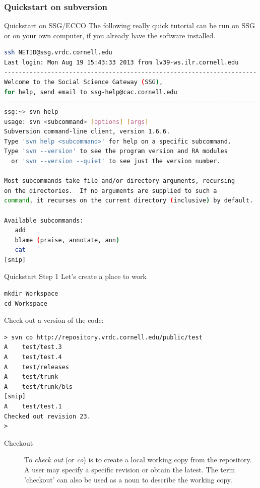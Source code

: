 \documentclass[xcolor=table,compress]{beamer}
\begin{document}
\subsubsection{Quickstart on subversion}
\begin{frame}[fragile]{Quickstart on SSG/ECCO}
The following really quick tutorial can be run on SSG or on your own computer, if you already have the software installed.
\begin{lstlisting}[language=bash,numbers=none]
ssh NETID@ssg.vrdc.cornell.edu
Last login: Mon Aug 19 15:43:33 2013 from lv39-ws.ilr.cornell.edu
----------------------------------------------------------------------
Welcome to the Social Science Gateway (SSG),
for help, send email to ssg-help@cac.cornell.edu
----------------------------------------------------------------------
ssg:~> svn help
usage: svn <subcommand> [options] [args]
Subversion command-line client, version 1.6.6.
Type 'svn help <subcommand>' for help on a specific subcommand.
Type 'svn --version' to see the program version and RA modules
  or 'svn --version --quiet' to see just the version number.

Most subcommands take file and/or directory arguments, recursing
on the directories.  If no arguments are supplied to such a
command, it recurses on the current directory (inclusive) by default.

Available subcommands:
   add
   blame (praise, annotate, ann)
   cat
[snip]
\end{lstlisting}
\end{frame}

\lstset{language=bash,numbers=none}
\begin{frame}[fragile]{Quickstart Step 1}
Let's create a place to work
\begin{lstlisting}
mkdir Workspace
cd Workspace
\end{lstlisting}
\pause
Check out a version of the code:
\begin{lstlisting}
> svn co http://repository.vrdc.cornell.edu/public/test
A    test/test.3
A    test/test.4
A    test/releases
A    test/trunk
A    test/trunk/bls
[snip]
A    test/test.1
Checked out revision 23.
> 
\end{lstlisting}
\small
\begin{description}
\item[Checkout] 
To \textit{check out} (or \textit{co}) is to create a local working copy from the repository. A user may specify a specific revision or obtain the latest. The term 'checkout' can also be used as a noun to describe the working copy. 
\end{description}
\end{frame}
\end{document}
